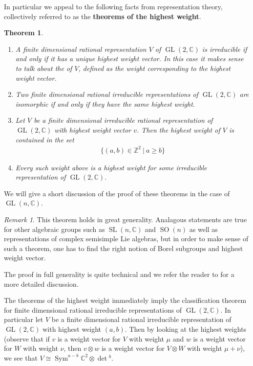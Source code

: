 \documentclass{amsart}
\newcommand{\st}{\ \vert \ }
\DeclareMathOperator{\GL}{GL}
\DeclareMathOperator{\Sym}{Sym}
\newcommand{\C}{\mathbb{C}}
\newcommand{\Z}{\mathbb{Z}}
\DeclareMathOperator{\SL}{SL}
\DeclareMathOperator{\SO}{SO}
\newcommand{\set}[1]{\{#1\}}
\numberwithin{equation}{section}
\theoremstyle{plain} %
\newtheorem{theorem}[equation]{Theorem}
\theoremstyle{definition}
\theoremstyle{remark}
\newtheorem{remark}[equation]{Remark}
\begin{document}
\hfill

In particular we appeal to the following facts from representation theory,
collectively referred to as the \textbf{theorems of the highest weight}.
\begin{theorem}\label{thm:hw}
	\hfill
	\begin{enumerate}
		\item A finite dimensional rational representation $V$ of $\GL(2,\C)$ is irreducible if and only if it has a unique highest weight vector.
		      In this case it makes sense to talk about the  of $V$, defined as the weight corresponding to the highest weight vector.
		\item Two finite dimensional rational irreducible representations of $\GL(2,\C)$ are isomorphic if and only if they have the same highest weight.
		\item Let $V$ be a finite dimensional irreducible rational representation of $\GL(2,\C)$ with highest weight vector $v$. Then the highest weight of $V$ is contained in the set \begin{align*}
			      \set{(a,b)\in \Z^2 \st a\geq b }
		      \end{align*}
		\item Every such weight above is a highest weight for some irreducible representation of $\GL(2,\C)$.
	\end{enumerate}
\end{theorem}

We will give a short discussion of the proof of these theorems in the case of $\GL(n,\C)$.

\begin{remark}
	This theorem holds in great generality. Analagous 
    statements are true for other algebraic groups such as $\SL(n,\C)$ and $\SO(n)$ as well as representations of complex semisimple Lie algebras,
	but in order to make sense of such a theorem, one has to find the right notion of Borel subgroups and
	highest weight vector.
\end{remark}

The proof in full generality is quite technical and we refer the reader to \cite{milne} for a more detailed discussion.

\hfill

The theorems of the highest weight immediately imply the classification theorem for finite dimensional rational irreducible representations of $\GL(2,\C)$.
In particular let $V$ be a finite dimensional rational irreducible representation of $\GL(2,\C)$ with highest weight $(a,b)$. Then
by looking at the highest weights (observe that if $v$ is a weight vector for $V$ with weight $\mu$ and
$w$ is a weight vector for $W$ with weight $\nu$, then $v\otimes w$ is a weight vector for $V\otimes W$ with weight $\mu + \nu$),
 we see that $V \cong \Sym^{a-b}\C^2 \otimes \det{}^{b}$.
\end{document}
